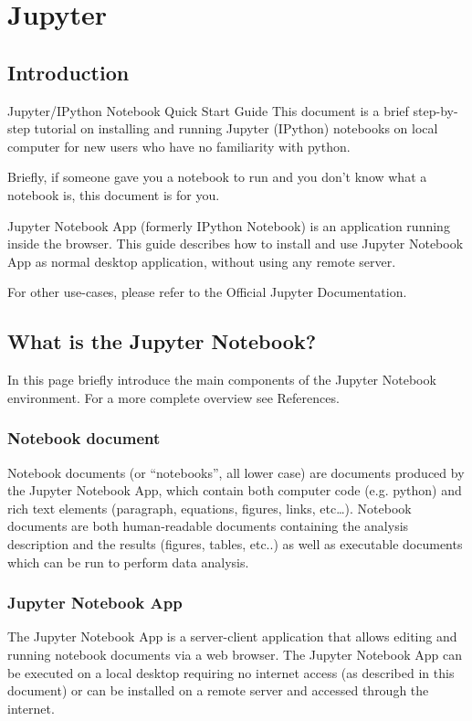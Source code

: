 \chapter{Jupyter}
\section{Introduction}
Jupyter/IPython Notebook Quick Start Guide
This document is a brief step-by-step tutorial on installing and running Jupyter (IPython) notebooks on local computer for new users who have no familiarity with python.

Briefly, if someone gave you a notebook to run and you don’t know what a notebook is, this document is for you.

Jupyter Notebook App (formerly IPython Notebook) is an application running inside the browser. This guide describes how to install and use Jupyter Notebook App as normal desktop application, without using any remote server.

For other use-cases, please refer to the Official Jupyter Documentation.

\section{What is the Jupyter Notebook?}

In this page briefly introduce the main components of the Jupyter Notebook environment. For a more complete overview see References.

\subsection{Notebook document}
Notebook documents (or “notebooks”, all lower case) are documents produced by the Jupyter Notebook App, which contain both computer code (e.g. python) and rich text elements (paragraph, equations, figures, links, etc…). Notebook documents are both human-readable documents containing the analysis description and the results (figures, tables, etc..) as well as executable documents which can be run to perform data analysis.
\subsection{Jupyter Notebook App}
The Jupyter Notebook App is a server-client application that allows editing and running notebook documents via a web browser. The Jupyter Notebook App can be executed on a local desktop requiring no internet access (as described in this document) or can be installed on a remote server and accessed through the internet.

